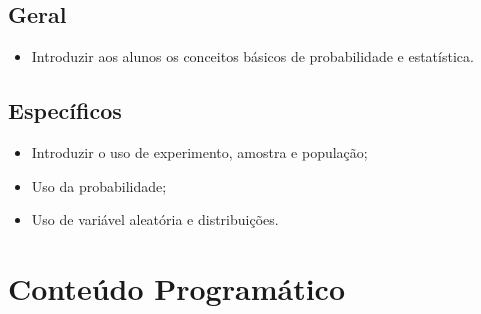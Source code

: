 \documentclass[
]{book}
\providecommand{\tightlist}{%
  \setlength{\itemsep}{0pt}\setlength{\parskip}{0pt}}
\begin{document}
\hypertarget{geral}{%
\subsection*{Geral}\label{geral}}

\begin{itemize}
\tightlist
\item
  Introduzir aos alunos os conceitos básicos de probabilidade e estatística.
\end{itemize}

\hypertarget{especuxedficos}{%
\subsection*{Específicos}\label{especuxedficos}}

\begin{itemize}
\tightlist
\item
  Introduzir o uso de experimento, amostra e população;
\item
  Uso da probabilidade;
\item
  Uso de variável aleatória e distribuições.
\end{itemize}

\hypertarget{conteuxfado-programuxe1tico}{%
\section*{Conteúdo Programático}\label{conteuxfado-programuxe1tico}}
\end{document}

